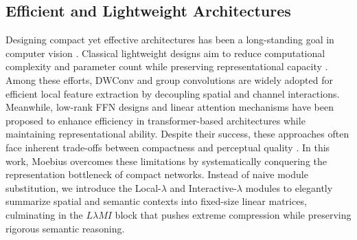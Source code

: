 \documentclass[runningheads]{llncs}
\begin{document}
\subsection{Efficient and Lightweight Architectures}
\vspace{-0.5em}
Designing compact yet effective architectures has been a long-standing goal in computer vision \cite{qin2024mobilenetv4}. Classical lightweight designs aim to reduce computational complexity and parameter count while preserving representational capacity \cite{li2022efficientformerv2}.
Among these efforts, DWConv \cite{Sandler2018MobileNetV2, tan2019efficientnet} and group convolutions \cite{zhang2018shufflenet} are widely adopted for efficient local feature extraction by decoupling spatial and channel interactions.
Meanwhile, low-rank FFN designs \cite{vaswani2017attention, shazeer2020glu, xie2024sana, xue2024openmoe, cai2023efficientvit} and linear attention mechanisms \cite{yang2024fla, yang2024gla, dao2022flashattention,Xu2024MoSt-DSA,xu2025garamost,bello2021lambdanetworks} have been proposed to enhance efficiency in transformer-based architectures \cite{xie2024sana, Peebles2022DiT, esser2024SD3, Zhu2025DiG} while maintaining representational ability.
Despite their success, these approaches often face inherent trade-offs between compactness and perceptual quality \cite{yao2025vavae}.
In this work, Moebius overcomes these limitations by systematically conquering the representation bottleneck of compact networks. Instead of naive module substitution, we introduce the Local-$\lambda$ and Interactive-$\lambda$ modules to elegantly summarize spatial and semantic contexts into fixed-size linear matrices, culminating in the $L\lambda MI$ block that pushes extreme compression while preserving rigorous semantic reasoning.
\vspace{-0.5em}

\vspace{-0.5em}
\end{document}

